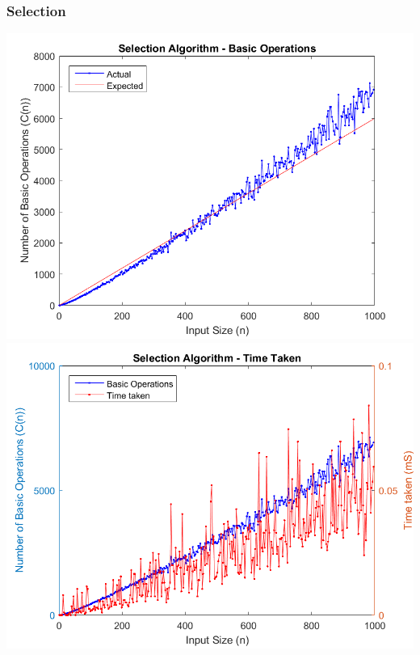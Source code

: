 \documentclass{article}
\begin{document}
        \subsubsection{Selection}
            \includegraphics[scale=0.6]{Images/selection_algorithm_basic_operations.png}\\
            \includegraphics[scale=0.6]{Images/selection_algorithm_time_taken.png}
\end{document}
